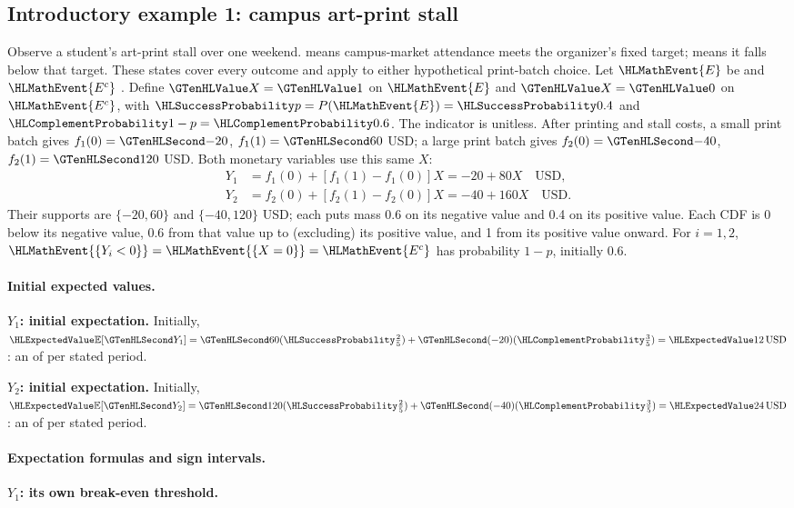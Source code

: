 \subsection{Introductory example 1: campus art-print stall}\label{ex:intro-one}
Observe a student's art-print stall over one weekend.  means campus-market
attendance meets the organizer's fixed target;  means it falls below that target.
These states cover every outcome and apply to either hypothetical print-batch choice.
Let $\HLMathEvent{E}$ be  and
$\HLMathEvent{E^c}$ . Define $\Indicator{X}=\Indicator{1}$ on $\HLMathEvent{E}$ and
$\Indicator{X}=\Indicator{0}$ on $\HLMathEvent{E^c}$, with $\SuccessProb{p}=P(\HLMathEvent{E})=\SuccessProb{0.4}$
and $\FailureProb{1-p}=\FailureProb{0.6}$. The indicator is unitless.
After printing and stall costs, a small print batch gives $f_1(0)=\Money{-20}$, $f_1(1)=\Money{60}$ USD;
a large print batch gives $f_2(0)=\Money{-40}$, $f_2(1)=\Money{120}$ USD.
Both monetary variables use this same $X$:
\[
\begin{aligned}
Y_1&=f_1(0)+[f_1(1)-f_1(0)]X=-20+80X\quad\text{USD},\\
Y_2&=f_2(0)+[f_2(1)-f_2(0)]X=-40+160X\quad\text{USD}.
\end{aligned}
\]
Their supports are $\{-20,60\}$ and $\{-40,120\}$ USD; each puts mass 0.6
on its negative value and 0.4 on its positive value. Each CDF is 0 below its
negative value, 0.6 from that value up to (excluding) its positive value,
and 1 from its positive value onward.
For $i=1,2$, $\HLMathEvent{\{Y_i<0\}}=\HLMathEvent{\{X=0\}}=\HLMathEvent{E^c}$ has probability $1-p$, initially 0.6.
\paragraph{Initial expected values.}
\textbf{$Y_1$: initial expectation.}
Initially, $\ExpectedValue{\mathbb E}[\Money{Y_1}]=\Money{60}(\SuccessProb{\frac{2}{5}})+\Money{(-20)}(\FailureProb{\frac{3}{5}})=\ExpectedValue{12\,\text{USD}}$:
an  of  per stated period.

\textbf{$Y_2$: initial expectation.}
Initially, $\ExpectedValue{\mathbb E}[\Money{Y_2}]=\Money{120}(\SuccessProb{\frac{2}{5}})+\Money{(-40)}(\FailureProb{\frac{3}{5}})=\ExpectedValue{24\,\text{USD}}$:
an  of  per stated period.
\paragraph{Expectation formulas and sign intervals.}
\textbf{$Y_1$: its own break-even threshold.}

